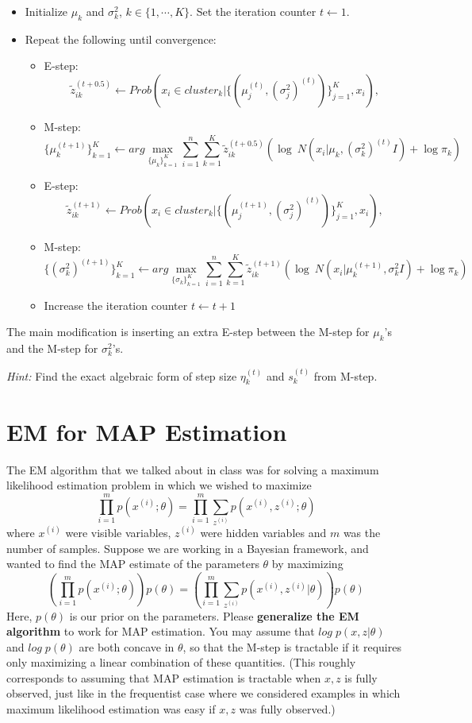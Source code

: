 \documentclass{article}
\theoremstyle{definition}
\theoremstyle{definition}
\theoremstyle{remark}
\begin{document}
\begin{itemize}
	\item Initialize $\mu_k$ and $\sigma_k^2$, $k \in \{1,\cdots ,K\}$. Set the iteration counter $t\leftarrow1$.
	\item Repeat the following until convergence:
	\begin{itemize}
		\item E-step:
		\[
		\tilde{z}_{ik}^{(t+0.5)} \leftarrow Prob\left(x_i\in cluster_k | \{(\mu_j^{(t)},(\sigma_j^2)^{(t)})\}_{j=1}^K,x_i\right),
		\]
		\item M-step:
		\[
		\{\mu_k^{(t+1)}\}_{k=1}^K \leftarrow arg\max_{\{\mu_k\}_{k=1}^K} \sum_{i=1}^n\sum_{k=1}^K \tilde{z}_{ik}^{(t+0.5)} \left(\log~N(x_i|\mu_k,(\sigma_k^2)^{(t)}I)+\log\pi_k\right)
		\]
		\item E-step:
		\[
		\tilde{z}_{ik}^{(t+1)} \leftarrow Prob\left(x_i \in cluster_k|\{(\mu_j^{(t+1)},(\sigma_j^2)^{(t)})\}_{j=1}^K,x_i\right),
		\]
		\item M-step:
		\[
		\{(\sigma_k^2)^{(t+1)}\}_{k=1}^K \leftarrow arg \max_{\{\sigma_k\}_{k=1}^K} \sum_{i=1}^n \sum_{k=1}^K \tilde{z}_{ik}^{(t+1)} \left(\log~N(x_i|\mu_k^{(t+1)},\sigma_k^2 I)+\log \pi_k \right)
		\]
		\item Increase the iteration counter $t\leftarrow t+1$
	\end{itemize}
\end{itemize}
The main modification is inserting an extra E-step between the M-step for $\mu_k$'s and the M-step for $\sigma_k^2$'s.

\emph{Hint:} Find the exact algebraic form of step size $\eta_k^{(t)}$ and $s_k^{(t)}$ from M-step.

\section*{EM for MAP Estimation}
The EM algorithm that we talked about in class was for solving a maximum likelihood estimation problem in which we wished to maximize
\begin{equation}
  \prod_{i = 1}^mp(x^{(i)};\theta) = \prod_{i = 1}^m \sum_{z^{(i)}}p(x^{(i)},z^{(i)};\theta)
\end{equation}
where $x^{(i)}$ were visible variables, $z^{(i)}$ were hidden variables and $m$ was the number of samples. Suppose we are working in a Bayesian framework, and wanted to find the MAP estimate of the parameters $\theta$ by maximizing
\begin{equation}
  (\prod_{i = 1}^mp(x^{(i)};\theta))p(\theta) = (\prod_{i = 1}^m \sum_{z^{(i)}}p(x^{(i)},z^{(i)}|\theta))p(\theta)
\end{equation}
Here, $p(\theta)$ is our prior on the parameters. Please \textbf{generalize the EM algorithm} to work for MAP
estimation. You may assume that $log\;p(x,z|\theta)$ and $log\;p(\theta)$ are both concave in $\theta$, so
that the M-step is tractable if it requires only maximizing a linear combination of these
quantities. (This roughly corresponds to assuming that MAP estimation is tractable when
$x, z$ is fully observed, just like in the frequentist case where we considered examples in
which maximum likelihood estimation was easy if $x, z$ was fully observed.)
\end{document}

